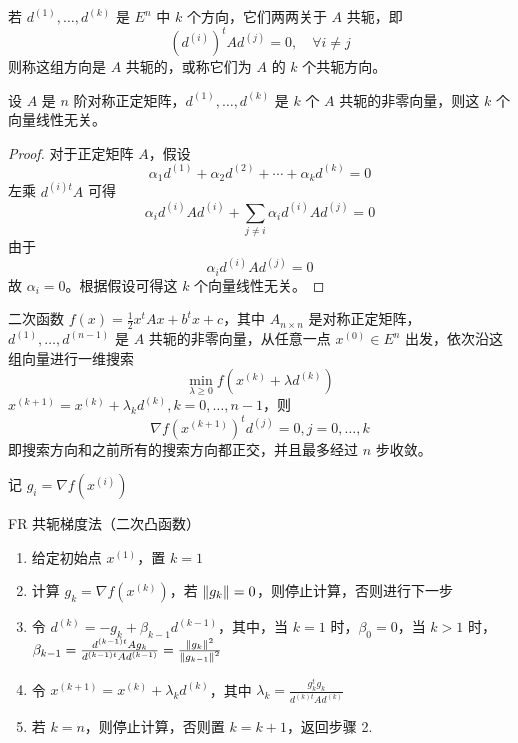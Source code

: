 \begin{definition}[k-共轭方向]
    若 $d^{(1)}, \dots, d^{(k)}$ 是 $E^n$ 中 $k$ 个方向，它们两两关于 $A$ 共轭，即 
    \[
        \left(d^{(i)}\right)^tAd^{(j)} = 0, \quad \forall i \neq j
    \]
    则称这组方向是 $A$ 共轭的，或称它们为 $A$ 的 $k$ 个共轭方向。
\end{definition}

\begin{theorem}
    设 $A$ 是 $n$ 阶对称正定矩阵，$d^{(1)}, \dots, d^{(k)}$ 是 $k$ 个 $A$ 共轭的非零向量，则这 $k$ 个向量线性无关。
    \begin{proof}
        对于正定矩阵 $A$，假设
        \[
            \alpha_{1} d^{(1)}+\alpha_{2} d^{(2)}+\cdots+\alpha_{k} d^{(k)}=0
        \] 
        左乘 $d^{(i)t}A$ 可得 
        \[
            \alpha_i d^{(i)} A d^{(i)} + \sum_{j \neq i}\alpha_i d^{(i)} A d^{(j)} = 0
        \]
        由于 
        \[
            \alpha_i d^{(i)} A d^{(j)} = 0
        \]
        故 $\alpha_i = 0$。根据假设可得这 $k$ 个向量线性无关。
    \end{proof}
\end{theorem}

\begin{theorem}
    二次函数 $f(x) = \frac{1}{2}x^tAx + b^tx + c$，其中 $A_{n \times n}$ 是对称正定矩阵，$d^{(1)}, \dots, d^{(n - 1)}$ 是 $A$ 共轭的非零向量，从任意一点 $x^{(0)} \in E^n$ 出发，依次沿这组向量进行一维搜索
    \[
        \underset{\lambda \ge 0}{\min} f(x^{(k)} + \lambda d^{(k)})
    \]
    $x^{(k + 1)} = x^{(k)} + \lambda_k d^{(k)}, k = 0, \dots, n - 1$，则 
    \[
        \nabla f(x^{(k + 1)})^t d^{(j)} = 0, j = 0, \dots, k
    \]
    即搜索方向和之前所有的搜索方向都正交，并且最多经过 $n$ 步收敛。
\end{theorem}

\begin{note}
    记 $g_i = \nabla f(x^{(i)})$

    FR 共轭梯度法（二次凸函数）\begin{enumerate}
        \item 给定初始点 $x^{(1)}$，置 $k = 1$
        \item 计算 $g_k = \nabla f(x^{(k)})$，若 $\norm{g_k} = 0$，则停止计算，否则进行下一步
        \item 令 $d^{(k)} = -g_k + \beta_{k - 1}d^{(k - 1)}$，其中，当 $k = 1$ 时，$\beta_0 = 0$，当 $k > 1$ 时，$\beta_{k - 1} = \frac{d^{(k - 1)t}Ag_k}{d^{(k - 1)t}Ad^{(k - 1)}} = \frac{\norm{g_k}^2}{\norm{g_{k - 1}}^2}$
        \item 令 $x^{(k + 1)} = x^{(k)} + \lambda_kd^{(k)}$，其中 $\lambda_k = \frac{g_k^tg_k}{d^{(k)t}Ad^{(k)}}$
        \item 若 $k = n$，则停止计算，否则置 $k = k + 1$，返回步骤 2.
    \end{enumerate}
\end{note}

